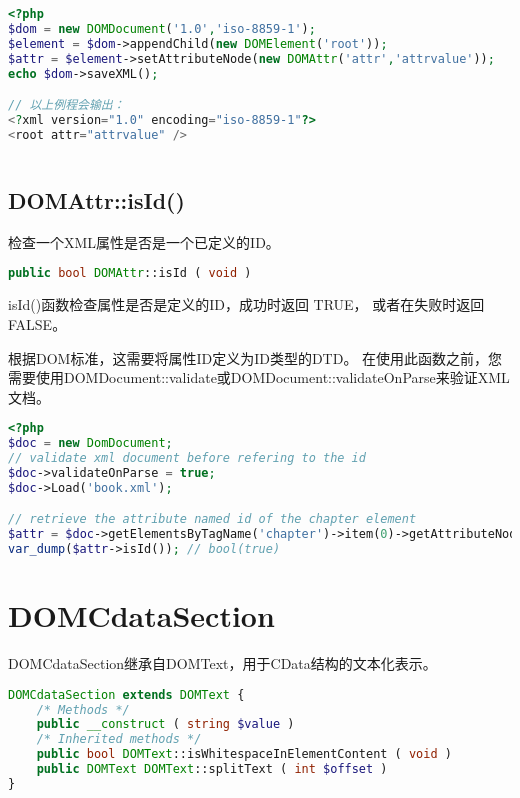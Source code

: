 \begin{lstlisting}[language=PHP]
<?php
$dom = new DOMDocument('1.0','iso-8859-1');
$element = $dom->appendChild(new DOMElement('root'));
$attr = $element->setAttributeNode(new DOMAttr('attr','attrvalue'));
echo $dom->saveXML();

// 以上例程会输出：
<?xml version="1.0" encoding="iso-8859-1"?>
<root attr="attrvalue" />
\end{lstlisting}


\begin{lstlisting}[language=PHP]

\end{lstlisting}



\subsection{DOMAttr::isId()}

检查一个XML属性是否是一个已定义的ID。

\begin{lstlisting}[language=PHP]
public bool DOMAttr::isId ( void )
\end{lstlisting}

isId()函数检查属性是否是定义的ID，成功时返回 TRUE， 或者在失败时返回 FALSE。

根据DOM标准，这需要将属性ID定义为ID类型的DTD。 在使用此函数之前，您需要使用DOMDocument::validate或DOMDocument::validateOnParse来验证XML文档。



\begin{lstlisting}[language=PHP]
<?php
$doc = new DomDocument;
// validate xml document before refering to the id
$doc->validateOnParse = true;
$doc->Load('book.xml');

// retrieve the attribute named id of the chapter element
$attr = $doc->getElementsByTagName('chapter')->item(0)->getAttributeNode('id');
var_dump($attr->isId()); // bool(true)
\end{lstlisting}


\section{DOMCdataSection}



DOMCdataSection继承自DOMText，用于CData结构的文本化表示。

\begin{lstlisting}[language=PHP]
DOMCdataSection extends DOMText {
    /* Methods */
    public __construct ( string $value )
    /* Inherited methods */
    public bool DOMText::isWhitespaceInElementContent ( void )
    public DOMText DOMText::splitText ( int $offset )
}
\end{lstlisting}


